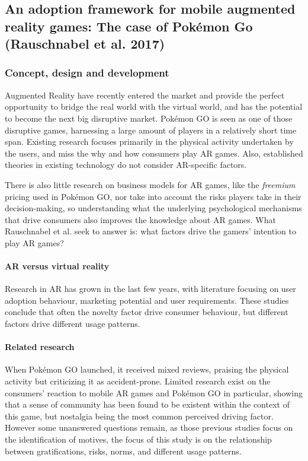 \documentclass[runningheads]{llncs}
\begin{document}
\subsection{An adoption framework for mobile augmented reality games: The case of Pokémon Go (Rauschnabel et al. 2017)}

\subsubsection{Concept, design and development}
\par Augmented Reality have recently entered the market and provide the perfect opportunity to bridge the real world with the virtual world, and has the potential to become the next big disruptive market. Pokémon GO is seen as one of those disruptive games, harnessing a large amount of players in a relatively short time span. Existing research focuses primarily in the physical activity undertaken by the users, and miss the why and how consumers play AR games. Also, established theories in existing technology do not consider AR-specific factors.
\par There is also little research on business models for AR games, like the \textit{freemium} pricing used in Pokémon GO, nor take into account the risks players take in their decision-making, so understanding what the underlying psychological mechanisms that drive consumers also improves the knowledge about AR games. What Rauschnabel et al. seek to answer is: what factors drive the gamers' intention to play AR games?

\paragraph{AR versus virtual reality} Research in AR has grown in the last few years, with literature focusing on user adoption behaviour, marketing potential and user requirements. These studies conclude that often the novelty factor drive consumer behaviour, but different factors drive different usage patterns.
\paragraph{Related research} When Pokémon GO launched, it received mixed reviews, praising the physical activity but criticizing it as accident-prone. Limited research exist on the consumers' reaction to mobile AR games and Pokémon GO in particular, showing that a sense of community has been found to be existent within the context of this game, but nostalgia being the most common perceived driving factor. However some unanswered questions remain, as those previous studies focus on the identification of motives, the focus of this study is on the
relationship between gratifications, risks, norms, and different usage patterns.
\end{document}
